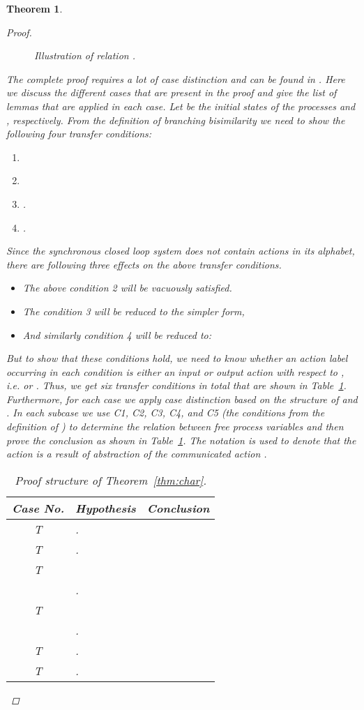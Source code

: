\documentclass[copyright]{eptcs}
\theoremstyle{plain}
\newtheorem{theorem}{Theorem}[section]
\theoremstyle{definition}
\newcounter{xcount}
\newcommand{\inct}{T\arabic{xcount}\addtocounter{xcount}{1}}
\begin{document}
\begin{theorem}
\begin{proof}
\begin{figure}
{\begin{tikzpicture}[->,>=stealth',shorten >=1pt,auto, semithick,]
\end{tikzpicture}          }
\caption{Illustration of relation .}\label{fig:phi}
\end{figure}
The complete proof requires a lot of case distinction and can be found in \citep{desync}. Here we discuss the different cases that are present in the proof and give the list of lemmas that are applied in each case. Let  be the initial states of the processes  and , respectively. From the definition of branching bisimilarity we need to show the following four transfer conditions:
\begin{enumerate}
\item 
\item\label{cond2} 
\item .
\item .
\end{enumerate}

Since the synchronous closed loop system does not contain  actions in its alphabet, there are following three effects on the above transfer conditions.
\begin{itemize}
\item The above condition 2 will be vacuously satisfied.
\item The condition 3 will be reduced to the simpler form,

\item And similarly condition 4 will be reduced to:

\end{itemize}
But to show that these conditions hold, we need to know whether an action label  occurring in each condition is either an input or output action with respect to , i.e.  or . Thus, we get six transfer conditions in total that are shown in Table~\ref{table1}. Furthermore, for each case we apply case distinction based on the structure of  and . In each subcase we use C1, C2, C3, C4, and C5 (the conditions from the definition of ) to determine the relation between free process variables  and then prove the conclusion as shown in Table~\ref{table1}. The notation  is used to denote that the  action is a result of abstraction of the communicated action .
\begin{table}[ht]
\caption{Proof structure of Theorem~\ref{thm:char}.}
\centering \begin{tabular}{|c|l|l|}
  \hline
  Case No. & Hypothesis & Conclusion\\
  \hline
\inct & . & \\
  \inct & .& \\
  \inct & &  \\
  & . & \\
  \inct & &  \\
  & . &\\
  \inct & .&  \\
  \inct & .& \\
  \hline
\end{tabular}
\label{table1}
\end{table}


\end{proof}
\end{theorem}
\end{document}
